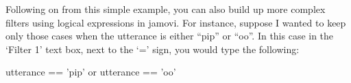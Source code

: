 Following on from this simple example, you can also build up more complex filters using logical expressions in jamovi. For instance, suppose I wanted to keep only those cases when the utterance is either ``pip'' or ``oo''. In this case in the `Filter 1' text box, next to the `=' sign, you would type the following:
\begin{rblock1}
utterance == 'pip' or utterance == 'oo'
\end{rblock1}


\begin{comment}
 - don't think this next section is required in jamovi



\section{Sorting, flipping and merging data~\label{sec:sort}}

In this section I discuss a few useful operations that I feel are loosely related to one another: sorting a vector, sorting a data frame, binding two or more vectors together into a data frame (or matrix), and flipping a data frame (or matrix) on its side. They're all fairly straightforward tasks, at least in comparison to some of the more obnoxious data handling problems that turn up in real life.




\section{Reshaping a data frame\label{sec:reshape}}




\SUBSECTION{Long form and wide form data}
The most common format in which you might obtain data is as a ``case by variable'' layout, commonly known as the \keyterm{wide form} of the data. 

\begin{rblock1}
> @usr{load("repeated.Rdata")}
> @usr{who()}
   -- Name --   -- Class --   -- Size --
   choice       data.frame    4 x 10    
   drugs        data.frame    10 x 8    
\end{rblock1}


\end{comment}
